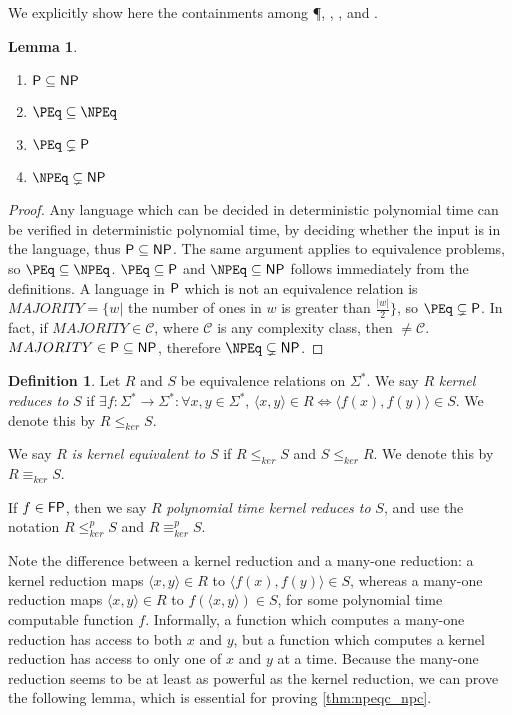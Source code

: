 \documentclass{article}
\newtheorem{lemma}[lemma]{Lemma}
\theoremstyle{definition} \newtheorem{definition}[definition]{Definition}
\newcommand{\sigmastar}{\Sigma^{*}} %
\newcommand{\kr}{\leq^{p}_{ker}} %
\newcommand{\krnt}{\leq_{ker}} %
\newcommand{\kequiv}{\equiv^{p}_{ker}} %
\newcommand{\kequivnt}{\equiv_{ker}} %
\newcommand{\defn}[1]{\emph{#1}} %
\newcommand{\pair}[2]{\langle#1,#2\rangle} %
\begin{document}
We explicitly show here the containments among \P, \NP, \PEq, and \NPEq.
\begin{lemma}
  \mbox{} %
  \begin{enumerate}
    \renewcommand{\labelenumi}{\roman{enumi}.}
  \item $\P\subseteq\NP$
  \item $\PEq\subseteq\NPEq$
  \item $\PEq\subsetneq\P$
  \item $\NPEq\subsetneq\NP$
  \end{enumerate}
\end{lemma}
\begin{proof}
  Any language which can be decided in deterministic polynomial time can be
  verified in deterministic polynomial time, by deciding whether the input is
  in the language, thus $\P\subseteq\NP$. The same argument applies to
  equivalence problems, so $\PEq\subseteq\NPEq$.  $\PEq\subseteq\P$ and
  $\NPEq\subseteq\NP$ follows immediately from the definitions. A language in
  $\P$ which is not an equivalence relation is $MAJORITY=\{w|$ the number of
  ones in $w$ is greater than $\frac{|w|}{2}\}$, so $\PEq\subsetneq\P$. In
  fact, if $MAJORITY\in\mathcal{C}$, where $\mathcal{C}$ is any complexity
  class, then \CEq$\neq\mathcal{C}$. $MAJORITY\in\P\subseteq\NP$, therefore
  $\NPEq\subsetneq\NP$.
\end{proof}

\begin{definition}\label{def:kr}
  Let $R$ and $S$ be equivalence relations on $\sigmastar$. We say $R$
  \defn{kernel reduces to} $S$ if $\exists
  f\colon\sigmastar\to\sigmastar:\forall x,y\in\sigmastar$, $\pair{x}{y}\in R
  \iff \pair{f(x)}{f(y)}\in S$. We denote this by $R\krnt S$.
  
  We say $R$ \defn{is kernel equivalent to} $S$ if $R\krnt S$ and $S\krnt
  R$. We denote this by $R\kequivnt S$.

  If $f\in\FP$, then we say $R$ \defn{polynomial time kernel reduces to} $S$,
  and use the notation $R\kr S$ and $R\kequiv S$.
\end{definition}

Note the difference between a kernel reduction and a many-one reduction: a
kernel reduction maps $\pair{x}{y}\in R$ to $\pair{f(x)}{f(y)}\in S$, whereas a
many-one reduction maps $\pair{x}{y}\in R$ to $f(\pair{x}{y})\in S$, for some
polynomial time computable function $f$. Informally, a function which computes
a many-one reduction has access to both $x$ and $y$, but a function which
computes a kernel reduction has access to only one of $x$ and $y$ at a
time. Because the many-one reduction seems to be at least as powerful as the
kernel reduction, we can prove the following lemma, which is essential for
proving \autoref{thm:npeqc_npc}.
\end{document}
